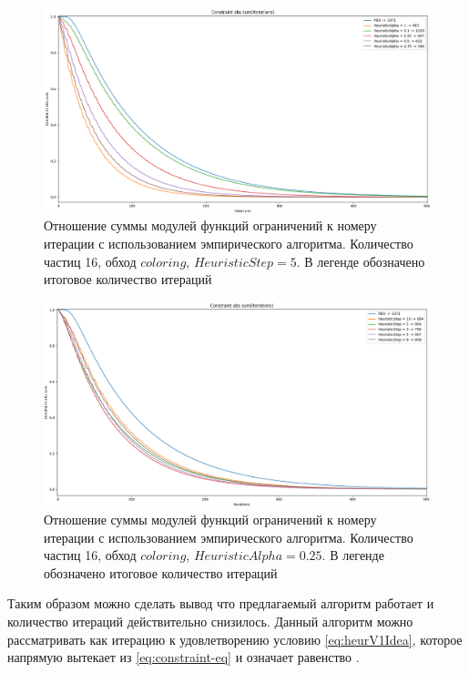 	\begin{figure}[ht!] 
		\center
		\includegraphics [scale=0.4] {my_folder/images//heuristicPlotAlpha.png}
		\caption{Отношение суммы модулей функций ограничений к номеру итерации с использованием эмпирического алгоритма. Количество частиц 16, обход $coloring$, $HeuristicStep=5$. В легенде обозначено итоговое количество итераций}
		\label{fig:heuristicPlotAlpha}  
	\end{figure}
	\FloatBarrier
	
	\begin{figure}[ht!] 
		\center
		\includegraphics [scale=0.4] {my_folder/images//heuristicPlotStep.png}
		\caption{Отношение суммы модулей функций ограничений к номеру итерации с использованием эмпирического алгоритма. Количество частиц 16, обход $coloring$, $HeuristicAlpha=0.25$. В легенде обозначено итоговое количество итераций}
		\label{fig:heuristicPlotStep}  
	\end{figure}	
	\FloatBarrier
	
	Таким образом можно сделать вывод что предлагаемый алгоритм работает и количество итераций действительно снизилось. Данный алгоритм можно рассматривать как итерацию к удовлетворению условию \ref{eq:heurV1Idea}, которое напрямую вытекает из \ref{eq:constraint-eq} и означает равенство .
	
